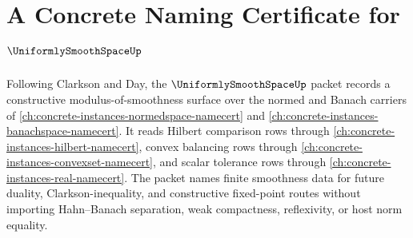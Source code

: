 \chapter{A Concrete Naming Certificate for $\UniformlySmoothSpaceUp$}
\label{ch:concrete-instances-uniformly-smooth-space-namecert}

Following Clarkson and Day, the $\UniformlySmoothSpaceUp$ packet records a constructive modulus-of-smoothness surface over the normed and Banach carriers of \autoref{ch:concrete-instances-normedspace-namecert} and \autoref{ch:concrete-instances-banachspace-namecert}. It reads Hilbert comparison rows through \autoref{ch:concrete-instances-hilbert-namecert}, convex balancing rows through \autoref{ch:concrete-instances-convexset-namecert}, and scalar tolerance rows through \autoref{ch:concrete-instances-real-namecert}. The packet names finite smoothness data for future duality, Clarkson-inequality, and constructive fixed-point routes without importing Hahn--Banach separation, weak compactness, reflexivity, or host norm equality.

